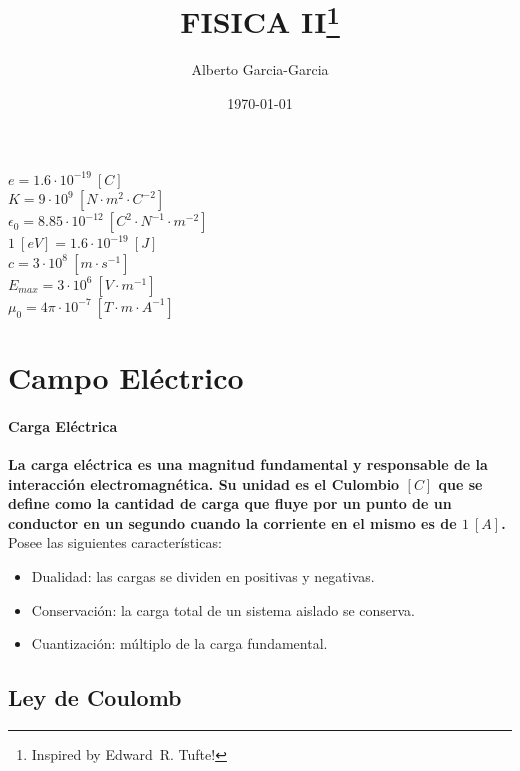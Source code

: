 \documentclass{tufte-handout}
\title{FISICA II\thanks{Inspired by Edward~R. Tufte!}}
\author[Alberto Garcia-Garcia]{Alberto Garcia-Garcia}
\date{\today}  %
\begin{document}
\maketitle%

\begin{abstract}
%
\end{abstract}

\tableofcontents

\clearpage

$e = 1.6\cdot 10^{-19}~[C]$\\
$K = 9\cdot 10^9~[N\cdot m^2 \cdot C^{-2}]$\\
$\epsilon_0 = 8.85\cdot 10^{-12}~[C^2\cdot N^{-1}\cdot m^{-2}]$\\
$1~[eV] = 1.6\cdot 10^{-19}~[J]$\\
$c = 3\cdot 10^8~[m\cdot s^{-1}]$\\
$E_{max} = 3\cdot 10^6~[V\cdot m^{-1}]$\\
$\mu_0 = 4\pi \cdot 10^{-7}~[T\cdot m \cdot A^{-1}]$\\

\clearpage

\section{Campo Eléctrico}

\paragraph{Carga Eléctrica} \textbf{La carga eléctrica es una magnitud fundamental y responsable de la interacción electromagnética. Su unidad es el Culombio $[C]$ que se define como la cantidad de carga que fluye por un punto de un conductor en un segundo cuando la corriente en el mismo es de $1~[A]$.} Posee las siguientes características:

\begin{itemize}
    \item Dualidad: las cargas se dividen en positivas y negativas.
    \item Conservación: la carga total de un sistema aislado se conserva.
    \item Cuantización: múltiplo de la carga fundamental.
\end{itemize}

\subsection{Ley de Coulomb}
\end{document}

